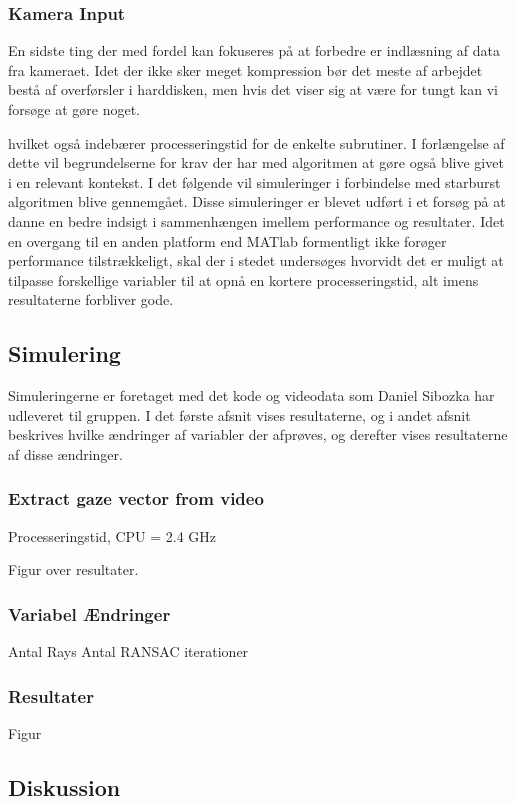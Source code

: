 \documentclass[rapport.tex]{subfiles}
\begin{document}
	\subsubsection{Kamera Input}
	En sidste ting der med fordel kan fokuseres på at forbedre er indlæsning af data fra kameraet. Idet der ikke sker meget kompression bør det meste af arbejdet bestå af overførsler i harddisken, men hvis det viser sig at være for tungt kan vi forsøge at gøre noget.
	
	
	 hvilket også indebærer processeringstid for de enkelte subrutiner. I forlængelse af dette vil begrundelserne for krav der har med algoritmen at gøre også blive givet i en relevant kontekst.
	I det følgende vil simuleringer i forbindelse med starburst algoritmen blive gennemgået. Disse simuleringer er blevet udført i et forsøg på at danne en bedre indsigt i sammenhængen imellem performance og resultater. Idet en overgang til en anden platform end MATlab formentligt ikke forøger performance tilstrækkeligt, skal der i stedet undersøges hvorvidt det er muligt at tilpasse forskellige variabler til at opnå en kortere processeringstid, alt imens resultaterne forbliver gode.
	
	\subsection{Simulering}
	
	Simuleringerne er foretaget med det kode og videodata som Daniel Sibozka har udleveret til gruppen. I det første afsnit vises resultaterne, og i andet afsnit beskrives hvilke ændringer af variabler der afprøves, og derefter vises resultaterne af disse ændringer.
	
	\subsubsection{Extract gaze vector from video}
	
	Processeringstid, CPU = 2.4 GHz
	
	Figur over resultater.
	
	\subsubsection{Variabel Ændringer}
	
	Antal Rays
	Antal RANSAC iterationer
	
	
	\subsubsection{Resultater}
	
	Figur 
	\subsection{Diskussion}
		
\end{document}
